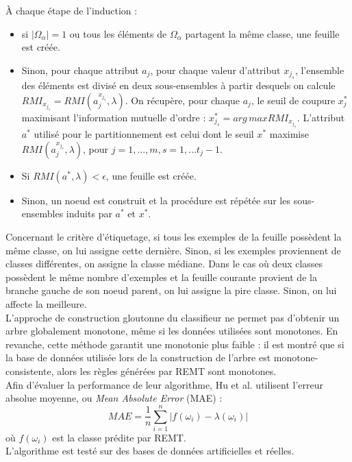 \documentclass[a4paper]{article}
\begin{document}
\noindent À chaque étape de l'induction :
\begin{itemize}
    \item si $|\Omega_{\alpha}| = 1$ ou tous les éléments
de $\Omega_{\alpha}$ partagent la même classe, une feuille est créée. 
    \item Sinon, pour chaque attribut $a_j$, pour chaque valeur d'attribut $x_{j_s}$, l'ensemble
des éléments est divisé en deux sous-ensembles à partir desquels on calcule
$RMI_{x_{j_s}} = RMI(a^{x_{j_s}}_j, \lambda)$. On récupère, pour chaque $a_j$,
le seuil de coupure $x^*_j$ maximisant l'information mutuelle d'ordre :
$x^*_{j_s} = arg\,max RMI_{x_{j_s}}.$ L'attribut $a^*$ utilisé pour le
partitionnement est celui dont le seuil $x^*$ maximise
$RMI(a^{x_{j_s}}_j,\lambda)$, pour $j=1,...,m, s=1,...t_j-1.$ 
    \item Si $RMI(a^*,
\lambda) < \epsilon$, une feuille est créée. 
    \item Sinon, un noeud est construit et la
procédure est répétée sur les sous-ensembles induits par $a^*$ et $x^*$. \\
\end{itemize}

Concernant le critère d'étiquetage, si tous les exemples de la feuille possèdent
la même classe, on lui assigne cette dernière. Sinon, si les exemples
proviennent de classes différentes, on assigne la classe médiane. Dans le cas où
deux classes possèdent le même nombre d'exemples et la feuille courante provient
de la branche gauche de son noeud parent, on lui assigne la pire classe. Sinon,
on lui affecte la meilleure.  \\

L'approche de construction gloutonne du classifieur ne permet pas d'obtenir un
arbre globalement monotone, même si les données utilisées sont monotones. En
revanche, cette méthode garantit une monotonie plus faible : il est montré que
si la base de données utilisée lors de la construction de l'arbre est
monotone-consistente, alors les règles générées par REMT sont monotones. \\

Afin d'évaluer la performance de leur algorithme, Hu et al. utilisent l'erreur absolue moyenne, ou
\emph{Mean Absolute Error} (MAE) :
$$ MAE = \frac{1}{n} \sum_{i=1}^{n}|f(\omega_i) - \lambda(\omega_i)| $$
où $f(\omega_i)$ est la classe prédite par REMT. \\

L'algorithme est testé sur des bases de données artificielles et réelles. 
\end{document}
